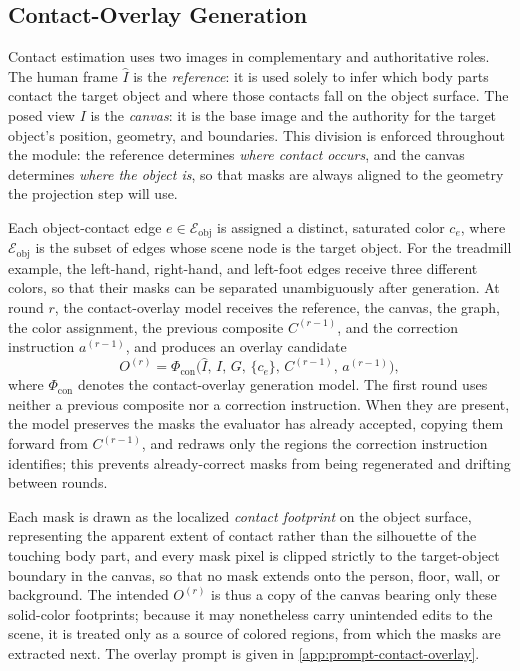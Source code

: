 \subsection{Contact-Overlay Generation}
\label{sec:method-contact-overlay}

Contact estimation uses two images in complementary and authoritative roles. The human frame $\hat{I}$ is the \emph{reference}: it is used solely to infer which body parts contact the target object and where those contacts fall on the object surface. The posed view $I$ is the \emph{canvas}: it is the base image and the authority for the target object's position, geometry, and boundaries. This division is enforced throughout the module: the reference determines \emph{where contact occurs}, and the canvas determines \emph{where the object is}, so that masks are always aligned to the geometry the projection step will use.

Each object-contact edge $e \in \mathcal{E}_{\mathrm{obj}}$ is assigned a distinct, saturated color $c_e$, where $\mathcal{E}_{\mathrm{obj}}$ is the subset of edges whose scene node is the target object. For the treadmill example, the left-hand, right-hand, and left-foot edges receive three different colors, so that their masks can be separated unambiguously after generation. At round $r$, the contact-overlay model receives the reference, the canvas, the graph, the color assignment, the previous composite $C^{(r-1)}$, and the correction instruction $a^{(r-1)}$, and produces an overlay candidate
\begin{equation}
\label{eq:contact-overlay-candidate}
O^{(r)} = \Phi_{\mathrm{con}}\bigl( \hat{I},\, I,\, G,\, \{c_e\},\, C^{(r-1)},\, a^{(r-1)} \bigr),
\end{equation}
where $\Phi_{\mathrm{con}}$ denotes the contact-overlay generation model. The first round uses neither a previous composite nor a correction instruction. When they are present, the model preserves the masks the evaluator has already accepted, copying them forward from $C^{(r-1)}$, and redraws only the regions the correction instruction identifies; this prevents already-correct masks from being regenerated and drifting between rounds.

Each mask is drawn as the localized \emph{contact footprint} on the object surface, representing the apparent extent of contact rather than the silhouette of the touching body part, and every mask pixel is clipped strictly to the target-object boundary in the canvas, so that no mask extends onto the person, floor, wall, or background. The intended $O^{(r)}$ is thus a copy of the canvas bearing only these solid-color footprints; because it may nonetheless carry unintended edits to the scene, it is treated only as a source of colored regions, from which the masks are extracted next. The overlay prompt is given in \cref{app:prompt-contact-overlay}.

